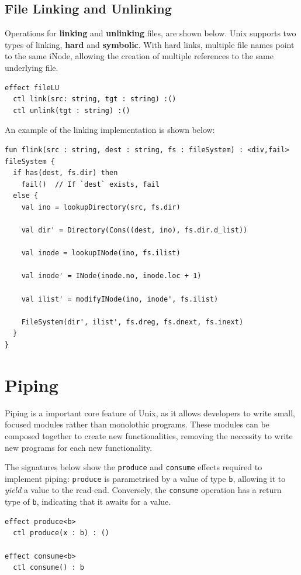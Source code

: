 \documentclass[logo,bsc,singlespacing,parskip]{infthesis}
\begin{document}
\subsection{File Linking and Unlinking}
Operations for \textbf{linking} and \textbf{unlinking} files, are shown below. Unix supports two types of linking, \textbf{hard} and \textbf{symbolic}. With hard links, multiple file names point to the same iNode, allowing the creation of multiple references to the same underlying file.

\begin{lstlisting}
effect fileLU
  ctl link(src: string, tgt : string) :()
  ctl unlink(tgt : string) :()
\end{lstlisting}

An example of the linking implementation is shown below:
\begin{lstlisting}
fun flink(src : string, dest : string, fs : fileSystem) : <div,fail> fileSystem {
  if has(dest, fs.dir) then
    fail()  // If `dest` exists, fail
  else {
    val ino = lookupDirectory(src, fs.dir)

    val dir' = Directory(Cons((dest, ino), fs.dir.d_list))

    val inode = lookupINode(ino, fs.ilist)

    val inode' = INode(inode.no, inode.loc + 1)

    val ilist' = modifyINode(ino, inode', fs.ilist)

    FileSystem(dir', ilist', fs.dreg, fs.dnext, fs.inext)
  }
}
\end{lstlisting}


\section{Piping}
Piping is a important core feature of Unix,  as it allows developers to write  small, focused modules rather than monolothic programs. These modules can be composed together to create new functionalities, removing the necessity to write new programs for each new functionality.

The signatures below show the \lstinline{produce} and \lstinline{consume} effects required to implement piping: \lstinline{produce} is parametrised by a value of type \lstinline{b}, allowing it to \textit{yield} a value to the read-end. Conversely, the \lstinline{consume} operation has a return type of \lstinline{b}, indicating that it awaits for a value.
\begin{lstlisting}
effect produce<b>
  ctl produce(x : b) : ()   

effect consume<b>
  ctl consume() : b         

\end{lstlisting}
\end{document}

